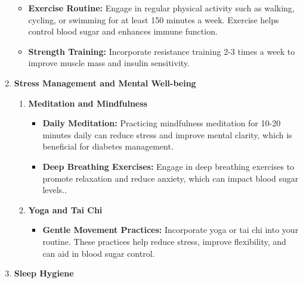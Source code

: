 \documentclass[12pt,a4paper]{article}
\begin{document}
\begin{enumerate}
    \begin{itemize}

        \item \textbf{Exercise Routine: }Engage in regular physical activity such as walking, cycling, or swimming for at least 150 minutes a week. Exercise helps control blood sugar and enhances immune function.

        \item \textbf{Strength Training:} Incorporate resistance training 2-3 times a week to improve muscle mass and insulin sensitivity.
 
    \end{itemize}

    \item \textbf{Stress Management and Mental Well-being}

    \begin{enumerate}
        \item \textbf{Meditation and Mindfulness}

        \begin{itemize}

        \item \textbf{Daily Meditation: }Practicing mindfulness meditation for 10-20 minutes daily can reduce stress and improve mental clarity, which is beneficial for diabetes management.

        \item \textbf{Deep Breathing Exercises: }  Engage in deep breathing exercises to promote relaxation and reduce anxiety, which can impact blood sugar levels..
     
        \end{itemize}

        \item \textbf{Yoga and Tai Chi}

        \begin{itemize}
            \item \textbf{Gentle Movement Practices: }Incorporate yoga or tai chi into your routine. These practices help reduce stress, improve flexibility, and can aid in blood sugar control.
        \end{itemize}
        
    \end{enumerate}

    \item \textbf{Sleep Hygiene}

     \begin{itemize}


\end{itemize}
\end{enumerate}
\end{document}
